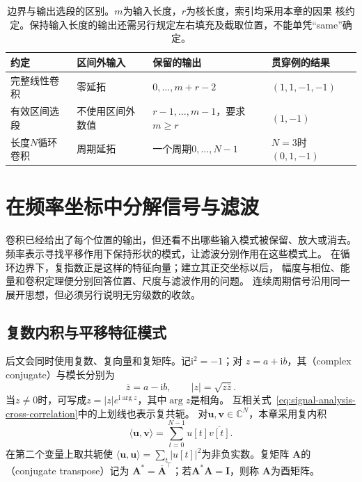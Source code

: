 \begin{table}[htbp]
  \centering
  \begin{tabularx}{\linewidth}{lXXX}
    \toprule
    约定 & 区间外输入 & 保留的输出 & 贯穿例的结果\\
    \midrule
    完整线性卷积 & 零延拓 & $0,\ldots,m+r-2$ & $(1,1,-1,-1)$\\
    有效区间选段 & 不使用区间外数值 & $r-1,\ldots,m-1$，要求$m\geq r$ & $(1,-1)$\\
    长度$N$循环卷积 & 周期延拓 & 一个周期$0,\ldots,N-1$ & $N=3$时$(0,1,-1)$\\
    \bottomrule
  \end{tabularx}
  \caption{边界与输出选段的区别。$m$为输入长度，$r$为核长度，索引均采用本章的因果
  核约定。保持输入长度的输出还需另行规定左右填充及截取位置，不能单凭“same”确定。}
  \label{tab:signal-boundary-conventions}
\end{table}

\section{在频率坐标中分解信号与滤波}
\label{sec:signal-analysis-frequency-representation}

卷积已经给出了每个位置的输出，但还看不出哪些输入模式被保留、放大或消去。
频率表示寻找平移作用下保持形状的模式，让滤波分别作用在这些模式上。
在循环边界下，复指数正是这样的特征向量；建立其正交坐标以后，
幅度与相位、能量和卷积定理便分别回答位置、尺度与滤波作用的问题。
连续周期信号沿用同一展开思想，但必须另行说明无穷级数的收敛。

\subsection{复数内积与平移特征模式}

后文会同时使用复数、复向量和复矩阵。记$\mathrm{i}^2=-1$；对
$z=a+\mathrm{i}b$，其（complex conjugate）与模长分别为
\[
  \overline z=a-\mathrm{i}b,
  \qquad
  |z|=\sqrt{z\overline z}.
\]
当$z\neq0$时，可写成$z=|z|e^{\mathrm{i}\arg z}$，其中$\arg z$是相角。
互相关式~\eqref{eq:signal-analysis-cross-correlation}中的上划线也表示复共轭。
对$\bm{u},\bm{v}\in\mathbb{C}^N$，本章采用复内积
\[
  \langle\bm{u},\bm{v}\rangle
  =
  \sum_{t=0}^{N-1}u[t]\overline{v[t]}.
\]
在第二个变量上取共轭使
$\langle\bm{u},\bm{u}\rangle=\sum_t|u[t]|^2$为非负实数。复矩阵
$\bm{A}$的（conjugate transpose）记为
$\bm{A}^*=\overline{\bm{A}}^{\top}$；若$\bm{A}^*\bm{A}=\bm{I}$，则称
$\bm{A}$为酉矩阵。

